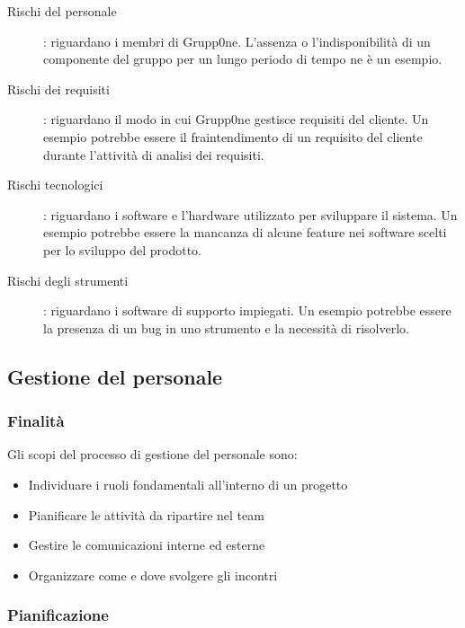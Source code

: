 \documentclass[../norme-di-progetto.tex]{subfiles}
\begin{document}
\begin{description}
  \item [Rischi del personale]: riguardano i membri di Grupp0ne. L'assenza o l'indisponibilità di un componente del gruppo per un lungo periodo di tempo ne è un esempio.
  \item [Rischi dei requisiti]: riguardano il modo in cui Grupp0ne gestisce requisiti del cliente. Un esempio potrebbe essere il fraintendimento di un requisito del cliente durante l'attività di analisi dei requisiti.
  \item [Rischi tecnologici]: riguardano i software e l'hardware utilizzato per sviluppare il sistema. Un esempio potrebbe essere la mancanza di alcune feature nei software scelti per lo sviluppo del prodotto.
  \item [Rischi degli strumenti]: riguardano i software di supporto impiegati. Un esempio potrebbe essere la presenza di un bug in uno strumento e la necessità di risolverlo.
\end{description}
\subsection{Gestione del personale}
\label{sub:gestione del personale}
\subsubsection{Finalità}
\label{subs:finalita}
Gli scopi del processo di gestione del personale sono:

\begin{itemize}
  \item Individuare i ruoli fondamentali all'interno di un progetto
  \item Pianificare le attività da ripartire nel team
  \item Gestire le comunicazioni interne ed esterne
  \item Organizzare come e dove svolgere gli incontri
\end{itemize}

\subsubsection{Pianificazione}%
\end{document}

